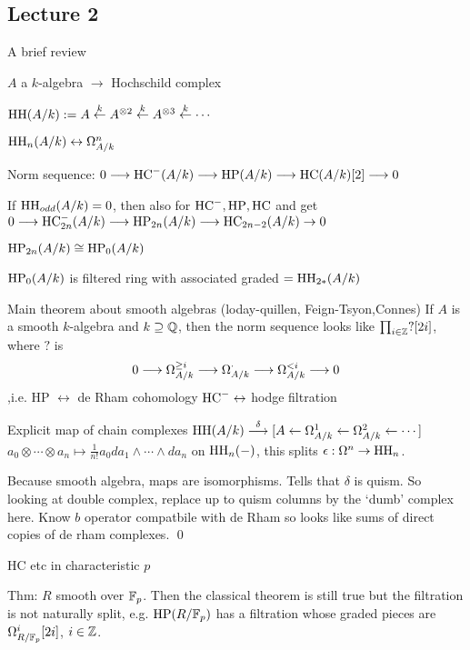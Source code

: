 \newpage
\subsection{Lecture 2}

A brief review

$A$ a $k$-algebra $\to$ Hochschild complex

$\operatorname{HH}(A/k):= A \stackrel{k}{\leftarrow} A^{\otimes 2} \stackrel{k}{\leftarrow} A^{\otimes 3} \stackrel{k}{\leftarrow} \cdots$

$\operatorname{HH}_n(A/k) \leftrightarrow \Omega^n_{A/k}$


Norm sequence: $0 \stackrel{}{\longrightarrow} \operatorname{HC}^-(A/k) \stackrel{}{\longrightarrow} \operatorname{HP}(A/k) \stackrel{}{\longrightarrow} \operatorname{HC} (A/k)[2] \stackrel{}{\longrightarrow} 0$

If $\operatorname{HH}_{odd}(A/k)=0$, then also for $\operatorname{HC}^-,\operatorname{HP},\operatorname{HC}$ and get
$0 \stackrel{}{\longrightarrow} \operatorname{HC}^-_{2n}(A/k) \stackrel{}{\longrightarrow} \operatorname{HP}_{2n}(A/k) \stackrel{}{\longrightarrow} \operatorname{HC}_{2n-2}(A/k) \to 0$

$\operatorname{HP}_{2n}(A/k) \cong \operatorname{HP}_0(A/k)$

$\operatorname{HP}_0(A/k)$ is filtered ring with associated graded $= \operatorname{HH}_{2*}(A/k)$


Main theorem about smooth algebras (loday-quillen, Feign-Tsyon,Connes) If $A$ is a smooth $k$-algebra and $k \supseteq \mathbb{Q}$, then the norm sequence looks like $\prod_{i \in \mathbb{Z}} ?[2i]$, where $?$ is 
	\[
	0 \stackrel{}{\longrightarrow} \Omega_{A/k}^{\geq i} \stackrel{}{\longrightarrow} \Omega_{A/k}^\cdot \stackrel{}{\longrightarrow} \Omega_{A/k}^{<i} \stackrel{}{\longrightarrow} 0
	\]
,i.e. HP $\leftrightarrow$ de Rham cohomology 
$\operatorname{HC}^- \leftrightarrow$ hodge filtration

\pf Explicit map of chain complexes 
$\operatorname{HH}(A/k) \stackrel{\delta}{\longrightarrow} [A \leftarrow \Omega_{A/k}^1 \leftarrow \Omega_{A/k}^2 \leftarrow \cdots]$
$a_0 \otimes \cdots \otimes a_n \mapsto \frac{1}{n!} a_0 da_1 \wedge \cdots \wedge da_n$
on $\operatorname{HH}_n(-)$, this splits $\epsilon: \Omega^n \to \operatorname{HH}_n$. 


Because smooth algebra, maps are isomorphisms. Tells that $\delta$ is quism. So looking at double complex, replace up to quism  columns by the `dumb' complex here. Know $b$ operator compatbile with de Rham so looks like sums of direct copies of de rham complexes. \qed 


HC etc in characteristic $p$

Thm: $R$ smooth over $\mathbb{F}_p$. Then the classical theorem is still true but the filtration is not naturally split, e.g. $\operatorname{HP}(R/\mathbb{F}_p)$ has a filtration whose graded pieces are $\Omega_{R/\mathbb{F}_p}^i[2i]$, $i \in \mathbb{Z}$.

